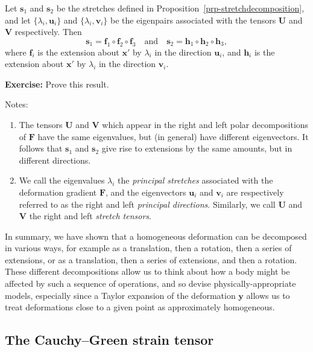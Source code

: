 \documentclass[
  letterpaper,
  DIV=11,
  numbers=noendperiod]{scrreprt}
\theoremstyle{plain}
\theoremstyle{remark}
\begin{document}
Let \({\boldsymbol{s}}_1\) and \({\boldsymbol{s}}_2\) be the stretches
defined in Proposition~\ref{prp-stretchdecomposition}, and let
\(\{\lambda_i,{\boldsymbol{u}}_i\}\) and
\(\{\lambda_i,{\boldsymbol{v}}_i\}\) be the eigenpairs associated with
the tensors \({\boldsymbol{U}}\) and \({\boldsymbol{V}}\) respectively.
Then
\[{\boldsymbol{s}}_1 = {\boldsymbol{f}}_1\circ{\boldsymbol{f}}_2\circ{\boldsymbol{f}}_3\quad\text{and}\quad{\boldsymbol{s}}_2={\boldsymbol{h}}_1\circ{\boldsymbol{h}}_2\circ{\boldsymbol{h}}_3,\]
where \({\boldsymbol{f}}_i\) is the extension about
\({\boldsymbol{x}}'\) by \(\lambda_i\) in the direction
\({\boldsymbol{u}}_i\), and \({\boldsymbol{h}}_i\) is the extension
about \({\boldsymbol{x}}'\) by \(\lambda_i\) in the direction
\({\boldsymbol{v}}_i\).

\textbf{Exercise:} Prove this result.

Notes:

\begin{enumerate}
\def\labelenumi{\arabic{enumi}.}
\item
  The tensors \({\boldsymbol{U}}\) and \({\boldsymbol{V}}\) which appear
  in the right and left polar decompositions of \({\boldsymbol{F}}\)
  have the same eigenvalues, but (in general) have different
  eigenvectors. It follows that \({\boldsymbol{s}}_1\) and
  \({\boldsymbol{s}}_2\) give rise to extensions by the same amounts,
  but in different directions.
\item
  We call the eigenvalues \(\lambda_i\) the \emph{principal stretches}
  associated with the deformation gradient \({\boldsymbol{F}}\), and the
  eigenvectors \({\boldsymbol{u}}_i\) and \({\boldsymbol{v}}_i\) are
  respectively referred to as the right and left \emph{principal
  directions}. Similarly, we call \({\boldsymbol{U}}\) and
  \({\boldsymbol{V}}\) the right and left \emph{stretch tensors}.
\end{enumerate}

In summary, we have shown that a homogeneous deformation can be
decomposed in various ways, for example as a translation, then a
rotation, then a series of extensions, or as a translation, then a
series of extensions, and then a rotation. These different
decompositions allow us to think about how a body might be affected by
such a sequence of operations, and so devise physically-appropriate
models, especially since a Taylor expansion of the deformation
\({\boldsymbol{y}}\) allows us to treat deformations close to a given
point as approximately homogeneous.

\subsection{The Cauchy--Green strain
tensor}\label{the-cauchygreen-strain-tensor}
\end{document}
